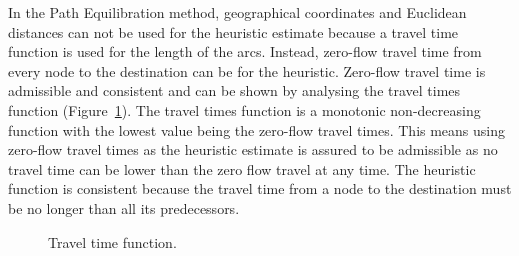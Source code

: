 In the Path Equilibration method,
geographical coordinates and Euclidean distances can not be used for the heuristic estimate because a travel time function is used for the length of the arcs.
Instead, zero-flow travel time from every node to the destination can be for the heuristic.
Zero-flow travel time is admissible and consistent and can be shown by
analysing the travel times function (Figure~\ref{fig:flowfunction}).
The travel times function is a monotonic non-decreasing function with the lowest value being the zero-flow travel times.
This means using zero-flow travel times as the heuristic estimate
is assured to be admissible
as no travel time can be lower than the zero flow travel at any time.
The heuristic function is consistent because the travel time from a node to the destination must be no longer than all its predecessors.

\begin{figure}[H]
    \centering
    \caption{Travel time function.}
    \label{fig:flowfunction}
\end{figure}


